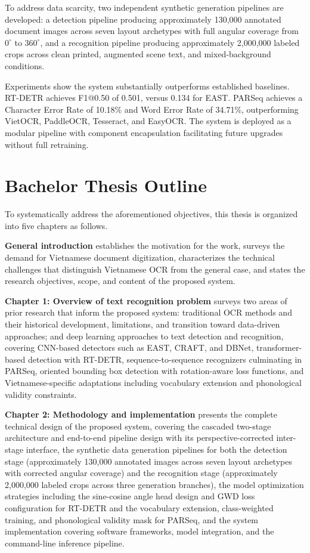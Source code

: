 To address data scarcity, two independent synthetic generation pipelines are developed: a detection pipeline producing approximately 130,000 annotated document images across seven layout archetypes with full angular coverage from $0^\circ$ to $360^\circ$, and a recognition pipeline producing approximately 2,000,000 labeled crops across clean printed, augmented scene text, and mixed-background conditions.

Experiments show the system substantially outperforms established baselines. RT-DETR achieves F1@0.50 of 0.501, versus 0.134 for EAST. PARSeq achieves a Character Error Rate of 10.18\% and Word Error Rate of 34.71\%, outperforming VietOCR, PaddleOCR, Tesseract, and EasyOCR. The system is deployed as a modular pipeline with component encapsulation facilitating future upgrades without full retraining.

\section{Bachelor Thesis Outline}

To systematically address the aforementioned objectives, this thesis is organized into five chapters as follows.

\textbf{General introduction} establishes the motivation for the work, surveys the demand for Vietnamese document digitization, characterizes the technical challenges that distinguish Vietnamese OCR from the general case, and states the research objectives, scope, and content of the proposed system.

\textbf{Chapter 1: Overview of text recognition problem} surveys two areas of prior research that inform the proposed system: traditional OCR methods and their historical development, limitations, and transition toward data-driven approaches; and deep learning approaches to text detection and recognition, covering CNN-based detectors such as EAST, CRAFT, and DBNet, transformer-based detection with RT-DETR, sequence-to-sequence recognizers culminating in PARSeq, oriented bounding box detection with rotation-aware loss functions, and Vietnamese-specific adaptations including vocabulary extension and phonological validity constraints.

\textbf{Chapter 2: Methodology and implementation} presents the complete technical design of the proposed system, covering the cascaded two-stage architecture and end-to-end pipeline design with its perspective-corrected inter-stage interface, the synthetic data generation pipelines for both the detection stage (approximately 130,000 annotated images across seven layout archetypes with corrected angular coverage) and the recognition stage (approximately 2,000,000 labeled crops across three generation branches), the model optimization strategies including the sine-cosine angle head design and GWD loss configuration for RT-DETR and the vocabulary extension, class-weighted training, and phonological validity mask for PARSeq, and the system implementation covering software frameworks, model integration, and the command-line inference pipeline.

